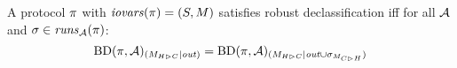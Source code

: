 \begin{lemma}
  A protocol $\pi$ with $\mathit{iovars}(\pi) = (S,M)$ satisfies robust declassification iff for all $\mathcal{A}$
  and $\sigma \in \mathit{runs}_{\mathcal{A}}(\pi)$:
  $$
  \mathrm{BD}(\pi,\mathcal{A})_{({M_{H \rhd C}}|{\mathit{out}})} =
  \mathrm{BD}(\pi,\mathcal{A})_{({M_{H \rhd C}}|{\mathit{out} \cup \sigma_{M_{C \rhd H}}})}
  $$
\end{lemma}


